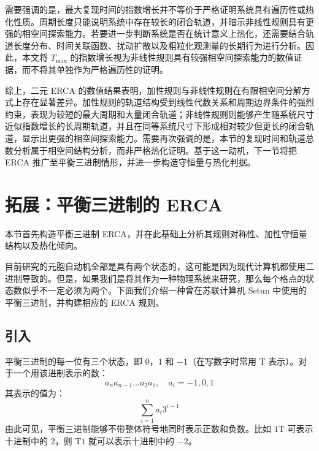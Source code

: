 \documentclass[reprint, amsmath, amssymb, aps, physrev,prb]{revtex4-2}
\begin{document}
需要强调的是，最大复现时间的指数增长并不等价于严格证明系统具有遍历性或热化性质。周期长度只能说明系统中存在较长的闭合轨道，并暗示非线性规则具有更强的相空间探索能力。若要进一步判断系统是否在统计意义上热化，还需要结合轨道长度分布、时间关联函数、扰动扩散以及粗粒化观测量的长期行为进行分析。因此，本文将 $T_{\max}$ 的指数增长视为非线性规则具有较强相空间探索能力的数值证据，而不将其单独作为严格遍历性的证明。

综上，二元 ERCA 的数值结果表明，加性规则与非线性规则在有限相空间分解方式上存在显著差异。加性规则的轨道结构受到线性代数关系和周期边界条件的强烈约束，表现为较短的最大周期和大量闭合轨道；非线性规则则能够产生随系统尺寸近似指数增长的长周期轨道，并且在同等系统尺寸下形成相对较少但更长的闭合轨道，显示出更强的相空间探索能力。需要再次强调的是，本节的复现时间和轨道总数分析属于相空间结构分析，而非严格热化证明。基于这一动机，下一节将把 ERCA 推广至平衡三进制情形，并进一步构造守恒量与热化判据。




\section{拓展：平衡三进制的 ERCA}

本节首先构造平衡三进制 ERCA，并在此基础上分析其规则对称性、加性守恒量结构以及热化倾向。

目前研究的元胞自动机全部是具有两个状态的，这可能是因为现代计算机都使用二进制导致的。但是，如果我们是将其作为一种物理系统来研究，那么每个格点的状态数似乎不一定必须为两个。下面我们介绍一种曾在苏联计算机 Setun 中使用的平衡三进制，并构建相应的 ERCA 规则\cite{Setun,VICHNIAC198496}。

\subsection{引入}

平衡三进制的每一位有三个状态，即 $0$，$1$ 和 $-1$（在写数字时常用 $\mathrm{T}$ 表示）。对于一个用该进制表示的数：
\begin{equation}
a_n a_{n-1} \dots a_2 a_1, \quad a_i = -1, 0, 1
\end{equation}
其表示的值为：
\begin{equation}
\sum_{i=1}^n a_i 3^{i-1}
\end{equation}
由此可见，平衡三进制能够不带整体符号地同时表示正数和负数。比如 $1\mathrm{T}$ 可表示十进制中的 $2$，则 $\mathrm{T}1$ 就可以表示十进制中的 $-2$。
\end{document}
